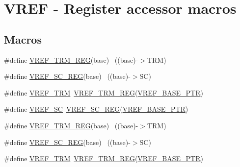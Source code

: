\hypertarget{group___v_r_e_f___register___accessor___macros}{}\section{V\+R\+EF -\/ Register accessor macros}
\label{group___v_r_e_f___register___accessor___macros}
\subsection*{Macros}
\begin{DoxyCompactItemize}
\item 
\#define \hyperlink{group___v_r_e_f___register___accessor___macros_ga58dc43651bdee9df31cca4b7cf50a2f1}{V\+R\+E\+F\+\_\+\+T\+R\+M\+\_\+\+R\+EG}(base)                                          ~((base)-\/$>$T\+RM)
\item 
\#define \hyperlink{group___v_r_e_f___register___accessor___macros_gab8590b69eb308634188edd3d3f4bfbb6}{V\+R\+E\+F\+\_\+\+S\+C\+\_\+\+R\+EG}(base)                                            ~((base)-\/$>$SC)
\item 
\#define \hyperlink{group___v_r_e_f___register___accessor___macros_ga3d9a836081732fa55a44bde53a2cb932}{V\+R\+E\+F\+\_\+\+T\+RM}~\hyperlink{group___v_r_e_f___register___accessor___macros_ga58dc43651bdee9df31cca4b7cf50a2f1}{V\+R\+E\+F\+\_\+\+T\+R\+M\+\_\+\+R\+EG}(\hyperlink{group___v_r_e_f___peripheral_ga53dba79dbefcdd6f788740a6d0caa57d}{V\+R\+E\+F\+\_\+\+B\+A\+S\+E\+\_\+\+P\+TR})
\item 
\#define \hyperlink{group___v_r_e_f___register___accessor___macros_ga58353078d385155f1c55fad5802549bb}{V\+R\+E\+F\+\_\+\+SC}~\hyperlink{group___v_r_e_f___register___accessor___macros_gab8590b69eb308634188edd3d3f4bfbb6}{V\+R\+E\+F\+\_\+\+S\+C\+\_\+\+R\+EG}(\hyperlink{group___v_r_e_f___peripheral_ga53dba79dbefcdd6f788740a6d0caa57d}{V\+R\+E\+F\+\_\+\+B\+A\+S\+E\+\_\+\+P\+TR})
\item 
\#define \hyperlink{group___v_r_e_f___register___accessor___macros_ga58dc43651bdee9df31cca4b7cf50a2f1}{V\+R\+E\+F\+\_\+\+T\+R\+M\+\_\+\+R\+EG}(base)                                          ~((base)-\/$>$T\+RM)
\item 
\#define \hyperlink{group___v_r_e_f___register___accessor___macros_gab8590b69eb308634188edd3d3f4bfbb6}{V\+R\+E\+F\+\_\+\+S\+C\+\_\+\+R\+EG}(base)                                            ~((base)-\/$>$SC)
\item 
\#define \hyperlink{group___v_r_e_f___register___accessor___macros_ga3d9a836081732fa55a44bde53a2cb932}{V\+R\+E\+F\+\_\+\+T\+RM}~\hyperlink{group___v_r_e_f___register___accessor___macros_ga58dc43651bdee9df31cca4b7cf50a2f1}{V\+R\+E\+F\+\_\+\+T\+R\+M\+\_\+\+R\+EG}(\hyperlink{group___v_r_e_f___peripheral_ga53dba79dbefcdd6f788740a6d0caa57d}{V\+R\+E\+F\+\_\+\+B\+A\+S\+E\+\_\+\+P\+TR})

\end{DoxyCompactItemize}
